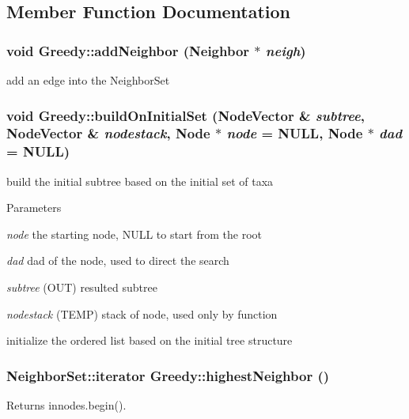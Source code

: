 \subsection{Member Function Documentation}
\hypertarget{classGreedy_aaa333c0d2919689abfe5a439f4e41b6a}{
\subsubsection[{addNeighbor}]{\setlength{\rightskip}{0pt plus 5cm}void Greedy::addNeighbor ({\bf Neighbor} $\ast$ {\em neigh})}}
\label{classGreedy_aaa333c0d2919689abfe5a439f4e41b6a}
add an edge into the NeighborSet \hypertarget{classGreedy_a52d592f837f77cd51b39b8f4c3f64e0c}{
\subsubsection[{buildOnInitialSet}]{\setlength{\rightskip}{0pt plus 5cm}void Greedy::buildOnInitialSet (NodeVector \& {\em subtree}, \/  NodeVector \& {\em nodestack}, \/  {\bf Node} $\ast$ {\em node} = {\ttfamily NULL}, \/  {\bf Node} $\ast$ {\em dad} = {\ttfamily NULL})}}
\label{classGreedy_a52d592f837f77cd51b39b8f4c3f64e0c}
build the initial subtree based on the initial set of taxa 
\begin{DoxyParams}{Parameters}
\item[{\em node}]the starting node, NULL to start from the root \item[{\em dad}]dad of the node, used to direct the search \item[{\em subtree}](OUT) resulted subtree \item[{\em nodestack}](TEMP) stack of node, used only by function\end{DoxyParams}
initialize the ordered list based on the initial tree structure \hypertarget{classGreedy_a6b90a3f292fcf91be8f0a156e67822f0}{
\subsubsection[{highestNeighbor}]{\setlength{\rightskip}{0pt plus 5cm}NeighborSet::iterator Greedy::highestNeighbor ()}}
\label{classGreedy_a6b90a3f292fcf91be8f0a156e67822f0}
\begin{DoxyReturn}{Returns}
innodes.begin(). 
\end{DoxyReturn}
